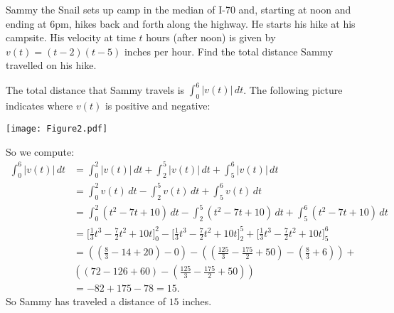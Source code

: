 \documentclass[nooutcomes]{ximera}
\renewcommand{\d}{\,d}
\newcommand{\eval}[1]{\bigg[ #1 \bigg]}
\renewenvironment{freeResponse}{
\ifhandout\setbox0\vbox\bgroup\else
\begin{trivlist}\item[\hskip \labelsep\bfseries Solution:\hspace{2ex}]
\fi}
{\ifhandout\egroup\else
\end{trivlist}
\fi}
\begin{document}
\begin{problem}
\begin{enumerate}
	\item  Sammy the Snail sets up camp in the median of I-70 and, starting at noon and ending at 6pm, hikes back and forth along the highway.  He starts his hike at his campsite.  His velocity at time $t$ hours (after noon)  is given by $v(t)=(t-2)(t-5)$ inches per hour.  Find the total distance Sammy travelled on his hike.  
		\begin{freeResponse}
		The total distance that Sammy travels is $\int_0^6 \left| v(t) \right| \d t$.  
		The following picture indicates where $v(t)$ is positive and negative:
			\begin{image}
			\texttt{[image: Figure2.pdf]}
			\end{image}
		So we compute:
			\begin{align*}
			\int_0^6 \left| v(t) \right| \d t &= \int_0^2 \left| v(t) \right| \d t + \int_2^5 \left| v(t) \right| \d t + \int_5^6 \left| v(t) \right| \d t  \\
			&= \int_0^2 v(t) \d t - \int_2^5 v(t) \d t + \int_5^6 v(t) \d t  \\
			&= \int_0^2 (t^2 - 7t + 10) \d t - \int_2^5 (t^2 - 7t + 10) \d t + \int_5^6 (t^2 - 7t + 10) \d t  \\
			&= \eval{\frac{1}{3}t^3-\frac{7}{2}t^2+10t}_0^2-\eval{\frac{1}{3}t^3-\frac{7}{2}t^2+10t}_2^5+\eval{\frac{1}{3}t^3-\frac{7}{2}t^2+10t}_5^6  \\
			&= \left( \left(\frac{8}{3}-14+20 \right)-0\right)-\left( \left( \frac{125}{3}-\frac{175}{2}+50 \right)-\left( \frac{8}{3}+6 \right) \right)+  \\
			&\left( \left( 72-126+60 \right) - \left( \frac{125}{3} - \frac{175}{2} + 50 \right) \right)  \\
			&= -82+175-78=15.
			\end{align*}
		So Sammy has traveled a distance of $15$ inches.
		\end{freeResponse}
		
		
		
	\end{enumerate}
		
		
\end{problem}








	
	
	
	
	
	
	
	
\end{document}
